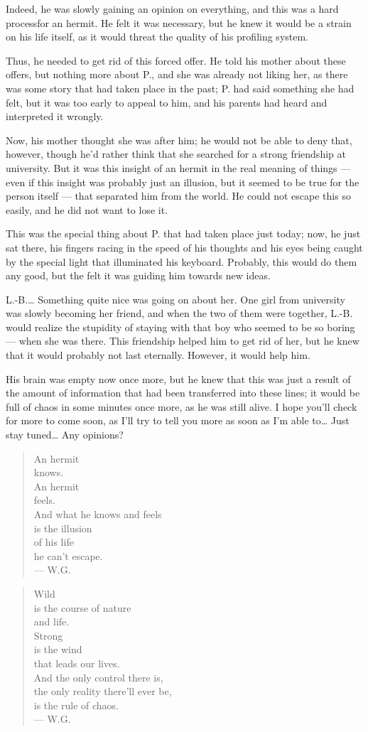 Indeed, he was slowly gaining an opinion on everything, and this was a hard processfor an hermit. He felt it was necessary, but he knew it would be a strain on his life itself, as it would threat the quality of his profiling system.

Thus, he needed to get rid of this forced offer. He told his mother about these offers, but nothing more about P., and she was already not liking her, as there was some story that had taken place in the past; P. had said something she had felt, but it was too early to appeal to him, and his parents had heard and interpreted it wrongly.

Now, his mother thought she was after him; he would not be able to deny that, however, though he'd rather think that she searched for a strong friendship at university. But it was this insight of an hermit in the real meaning of things --- even if this insight was probably just an illusion, but it seemed to be true for the person itself --- that separated him from the world. He could not escape this so easily, and he did not want to lose it.

This was the special thing about P. that had taken place just today; now, he just sat there, his fingers racing in the speed of his thoughts and his eyes being caught by the special light that illuminated his keyboard. Probably, this would do them any good, but the felt it was guiding him towards new ideas.

L.-B.\ldots
Something quite nice was going on about her. One girl from university was slowly becoming her friend, and when the two of them were together, L.-B. would realize the stupidity of staying with that boy who seemed to be so boring --- when she was there. This friendship helped him to get rid of her, but he knew that it would probably not last eternally. However, it would help him.

His brain was empty now once more, but he knew that this was just a result of the amount of information that had been transferred into these lines; it would be full of chaos in some minutes once more, as he was still alive. 
I hope you'll check for more to come soon, as I'll try to tell you more as soon as I'm able to\ldots
Just stay tuned\ldots
Any opinions?

\begin{quote}
An hermit \\
knows. \\
An hermit \\
feels. \\
And what he knows and feels \\
is the illusion \\
of his life \\
he can't escape. \\
--- W.G.
\end{quote}

\begin{quote}
Wild \\
is the course of nature \\
and life. \\
Strong \\
is the wind \\
that leads our lives. \\
And the only control there is, \\
the only reality there'll ever be, \\
is the rule of chaos. \\
--- W.G.
\end{quote}
